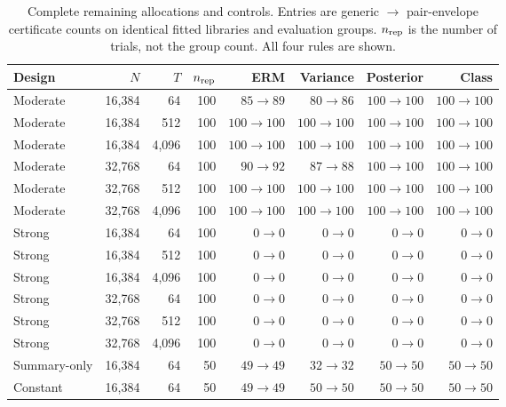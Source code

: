 \begin{table}[ht]
\centering\small
\setlength{\tabcolsep}{3.5pt}
\caption{Complete remaining allocations and controls. Entries are generic $\to$ pair-envelope certificate counts on identical fitted libraries and evaluation groups. $n_{\rm rep}$ is the number of trials, not the group count. All four rules are shown.}\label{tab:other}
\begin{tabular}{@{}lrrr rrrr@{}}
\toprule
Design & $N$ & $T$ & $n_{\rm rep}$ & ERM & Variance & Posterior & Class\\
\midrule
Moderate & 16,384 & 64 & 100 & $85\to 89$ & $80\to 86$ & $100\to 100$ & $100\to 100$\\
Moderate & 16,384 & 512 & 100 & $100\to 100$ & $100\to 100$ & $100\to 100$ & $100\to 100$\\
Moderate & 16,384 & 4,096 & 100 & $100\to 100$ & $100\to 100$ & $100\to 100$ & $100\to 100$\\
Moderate & 32,768 & 64 & 100 & $90\to 92$ & $87\to 88$ & $100\to 100$ & $100\to 100$\\
Moderate & 32,768 & 512 & 100 & $100\to 100$ & $100\to 100$ & $100\to 100$ & $100\to 100$\\
Moderate & 32,768 & 4,096 & 100 & $100\to 100$ & $100\to 100$ & $100\to 100$ & $100\to 100$\\
\midrule
Strong & 16,384 & 64 & 100 & $0\to 0$ & $0\to 0$ & $0\to 0$ & $0\to 0$\\
Strong & 16,384 & 512 & 100 & $0\to 0$ & $0\to 0$ & $0\to 0$ & $0\to 0$\\
Strong & 16,384 & 4,096 & 100 & $0\to 0$ & $0\to 0$ & $0\to 0$ & $0\to 0$\\
Strong & 32,768 & 64 & 100 & $0\to 0$ & $0\to 0$ & $0\to 0$ & $0\to 0$\\
Strong & 32,768 & 512 & 100 & $0\to 0$ & $0\to 0$ & $0\to 0$ & $0\to 0$\\
Strong & 32,768 & 4,096 & 100 & $0\to 0$ & $0\to 0$ & $0\to 0$ & $0\to 0$\\
\midrule
Summary-only & 16,384 & 64 & 50 & $49\to 49$ & $32\to 32$ & $50\to 50$ & $50\to 50$\\
\midrule
Constant & 16,384 & 64 & 50 & $49\to 49$ & $50\to 50$ & $50\to 50$ & $50\to 50$\\
\bottomrule
\end{tabular}
\end{table}
